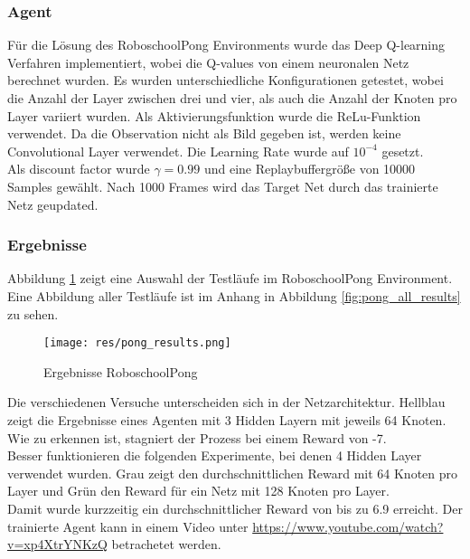 \documentclass[11pt]{scrartcl}
\begin{document}
\subsubsection{Agent}
Für die Lösung des RoboschoolPong Environments wurde das Deep Q-learning Verfahren implementiert,
wobei die Q-values von einem neuronalen Netz berechnet wurden. Es wurden unterschiedliche
Konfigurationen getestet, wobei die Anzahl der Layer zwischen drei und vier, als auch die
Anzahl der Knoten pro Layer variiert wurden. Als Aktivierungsfunktion wurde die
ReLu-Funktion verwendet. Da die Observation nicht als Bild gegeben ist, werden keine
Convolutional Layer verwendet. Die Learning Rate wurde auf $10^{-4}$ gesetzt.\\
Als discount factor wurde $\gamma = 0.99$ und eine Replaybuffergröße von 10000
Samples gewählt. Nach 1000 Frames wird das Target Net durch das trainierte Netz geupdated.

\subsubsection{Ergebnisse}
Abbildung \ref{fig:pong_results} zeigt eine Auswahl der Testläufe im RoboschoolPong Environment.
Eine Abbildung aller Testläufe ist im Anhang in Abbildung \ref{fig:pong_all_results} zu
sehen.

\begin{figure}[htp]
\centering
\texttt{[image: res/pong\_results.png]}
\caption{Ergebnisse RoboschoolPong}
\label{fig:pong_results}
\end{figure}
\noindent
Die verschiedenen Versuche unterscheiden sich in der Netzarchitektur. Hellblau zeigt die
Ergebnisse eines Agenten mit 3 Hidden Layern mit jeweils 64 Knoten. Wie zu erkennen ist,
stagniert der Prozess bei einem Reward von -7.\\
Besser funktionieren die folgenden Experimente, bei denen 4 Hidden Layer verwendet wurden.
Grau zeigt den durchschnittlichen Reward mit 64 Knoten pro Layer und Grün den Reward für
ein Netz mit 128 Knoten pro Layer.\\
Damit wurde kurzzeitig ein durchschnittlicher Reward von bis zu 6.9 erreicht. Der
trainierte Agent kann in einem Video unter \url{https://www.youtube.com/watch?v=xp4XtrYNKzQ}
betrachetet werden.

\newpage
\end{document}
